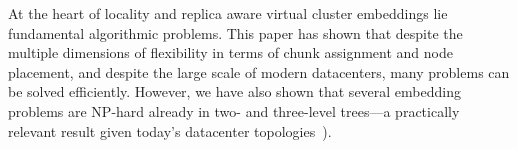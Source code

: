 \documentclass[preprint,12pt]{elsarticle}
\newcommand{\CC}{\textsc{NI}}
\newcommand{\FP}{\textsc{FP}}
\newcommand{\RS}{\textsc{RS}}
\newcommand{\BW}{\textsc{BW}}
\newcommand{\MA}{\textsc{MA}}
\begin{document}

At the heart of locality and replica aware virtual cluster embeddings lie fundamental algorithmic problems.
This paper has shown that despite the
multiple dimensions of flexibility in terms of chunk assignment and node placement, 
and despite the large scale of modern datacenters, 
many problems can be solved efficiently. However, we have also
shown that several embedding problems are NP-hard already in two-
and three-level trees---a practically relevant result given today's datacenter topologies~\cite{fattree}).
\end{document}
